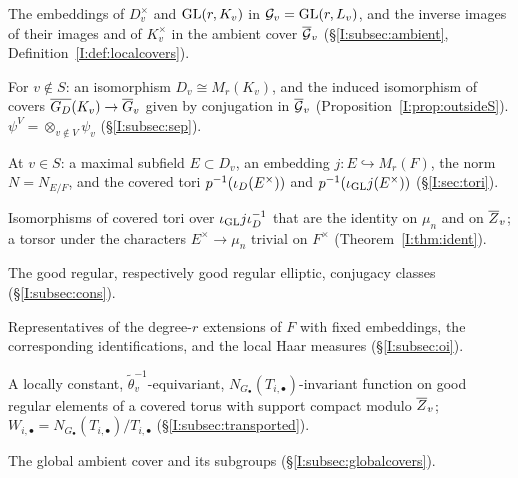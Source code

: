 \begin{description}[style=nextline,leftmargin=1.5em]
\item[$\iD$, $\iG$; $\GDb(K_v)$, $\Gb_v$, $\Zb_v$] The embeddings of $D_v^\times$ and $\operatorname{GL}(r,K_v)$ in $\mathcal{G}_v=\operatorname{GL}(r,L_v)$, and the inverse images of their images and of $K_v^\times$ in the ambient cover $\overline{\mathcal{G}}_v$ (\S\ref{I:subsec:ambient}, Definition~\ref{I:def:localcovers}).
\item[$\alpha_v$, $\psi_v$] For $v\notin S$: an isomorphism $D_v\cong M_r(K_v)$, and the induced isomorphism of covers $\overline{G_D}(K_v)\to\overline G_v$ given by conjugation in $\overline{\mathcal{G}}_v$ (Proposition~\ref{I:prop:outsideS}). $\psi^V=\otimes_{v\notin V}\psi_v$ (\S\ref{I:subsec:sep}).
\item[$E$, $j$, $N$; $\Eb_D$, $\Eb_{\GL}$] At $v\in S$: a maximal subfield $E\subset D_v$, an embedding $j:E\hookrightarrow M_r(F)$, the norm $N=N_{E/F}$, and the covered tori $p^{-1}(\iota_D(E^\times))$ and $p^{-1}(\iota_{\operatorname{GL}} j(E^\times))$ (\S\ref{I:sec:tori}).
\item[$\Iso_{\Zb}(\Eb_D,\Eb_{\GL})$] Isomorphisms of covered tori over $\iota_{\operatorname{GL}} j\iota_D^{-1}$ that are the identity on $\mu_n$ and on $\Zb_v$; a torsor under the characters $E^\times\to\mu_n$ trivial on $F^\times$ (Theorem~\ref{I:thm:ident}).
\item[$\mathcal C^{g}(\GDb(K_v))$, $\mathcal C^{g}_{\mathrm{ell}}(\Gb_v)$] The good regular, respectively good regular elliptic, conjugacy classes (\S\ref{I:subsec:cons}).
\item[$E_i$, $j_i$, $\jj_i$; $dg_D$, $dg$, $dt_i$] Representatives of the degree-$r$ extensions of $F$ with fixed embeddings, the corresponding identifications, and the local Haar measures (\S\ref{I:subsec:oi}).
\item[Admissible function; $W_{i,\bullet}$] A locally constant, $\tilde\theta_v^{-1}$-equivariant, $N_{G_\bullet}(T_{i,\bullet})$-invariant function on good regular elements of a covered torus with support compact modulo $\Zb_v$; $W_{i,\bullet}=N_{G_\bullet}(T_{i,\bullet})/T_{i,\bullet}$ (\S\ref{I:subsec:transported}).
\item[$\cGb(\A_L)$, $\GDb(\A_K)$, $\Gb(\A_K)$, $\Zb(\A_K)$] The global ambient cover and its subgroups (\S\ref{I:subsec:globalcovers}).

\end{description}
